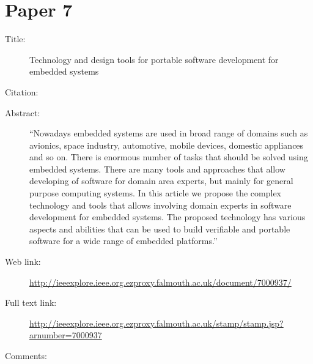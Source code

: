 \documentclass{scrartcl}
\begin{document}
\section*{Paper 7}
\begin{description}
\item[Title:] Technology and design tools for portable software development for embedded systems
\item[Citation:] \cite{Sedov}
\item[Abstract:] ``Nowadays embedded systems are used in broad range of domains such as avionics, space industry, automotive, mobile devices, domestic appliances and so on. There is enormous number of tasks that should be solved using embedded systems. There are many tools and approaches that allow developing of software for domain area experts, but mainly for general purpose computing systems. In this article we propose the complex technology and tools that allows involving domain experts in software development for embedded systems. The proposed technology has various aspects and abilities that can be used to build verifiable and portable software for a wide range of embedded platforms.''
\item[Web link:] \url{http://ieeexplore.ieee.org.ezproxy.falmouth.ac.uk/document/7000937/}
\item[Full text link:]  \url{http://ieeexplore.ieee.org.ezproxy.falmouth.ac.uk/stamp/stamp.jsp?arnumber=7000937}
\item[Comments:]
\end{description}
\end{document}
